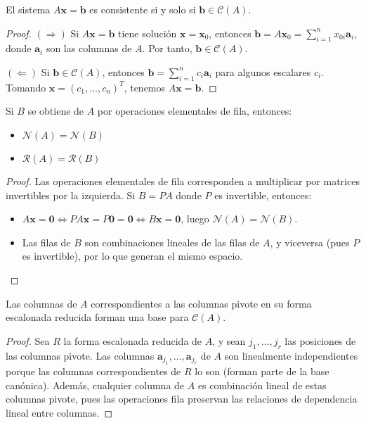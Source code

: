 \begin{theorem}
El sistema $A\mathbf{x} = \mathbf{b}$ es consistente si y solo si $\mathbf{b} \in \mathcal{C}(A)$.
\begin{proof}
$(\Rightarrow)$ Si $A\mathbf{x} = \mathbf{b}$ tiene solución $\mathbf{x} = \mathbf{x}_0$, entonces $\mathbf{b} = A\mathbf{x}_0 = \sum_{i=1}^n x_{0i} \mathbf{a}_i$, donde $\mathbf{a}_i$ son las columnas de $A$. Por tanto, $\mathbf{b} \in \mathcal{C}(A)$.

$(\Leftarrow)$ Si $\mathbf{b} \in \mathcal{C}(A)$, entonces $\mathbf{b} = \sum_{i=1}^n c_i \mathbf{a}_i$ para algunos escalares $c_i$. Tomando $\mathbf{x} = (c_1, \ldots, c_n)^T$, tenemos $A\mathbf{x} = \mathbf{b}$.
\end{proof}
\end{theorem}

\begin{theorem}
Si $B$ se obtiene de $A$ por operaciones elementales de fila, entonces:
\begin{itemize}
    \item $\mathcal{N}(A) = \mathcal{N}(B)$
    \item $\mathcal{R}(A) = \mathcal{R}(B)$
\end{itemize}
\begin{proof}
Las operaciones elementales de fila corresponden a multiplicar por matrices invertibles por la izquierda. Si $B = PA$ donde $P$ es invertible, entonces:
\begin{itemize}
    \item $A\mathbf{x} = \mathbf{0} \iff PA\mathbf{x} = P\mathbf{0} = \mathbf{0} \iff B\mathbf{x} = \mathbf{0}$, luego $\mathcal{N}(A) = \mathcal{N}(B)$.
    \item Las filas de $B$ son combinaciones lineales de las filas de $A$, y viceversa (pues $P$ es invertible), por lo que generan el mismo espacio.
\end{itemize}
\end{proof}
\end{theorem}

\begin{theorem}
Las columnas de $A$ correspondientes a las columnas pivote en su forma escalonada reducida forman una base para $\mathcal{C}(A)$.
\begin{proof}
Sea $R$ la forma escalonada reducida de $A$, y sean $j_1, \ldots, j_r$ las posiciones de las columnas pivote. Las columnas $\mathbf{a}_{j_1}, \ldots, \mathbf{a}_{j_r}$ de $A$ son linealmente independientes porque las columnas correspondientes de $R$ lo son (forman parte de la base canónica). Además, cualquier columna de $A$ es combinación lineal de estas columnas pivote, pues las operaciones fila preservan las relaciones de dependencia lineal entre columnas.
\end{proof}
\end{theorem}


